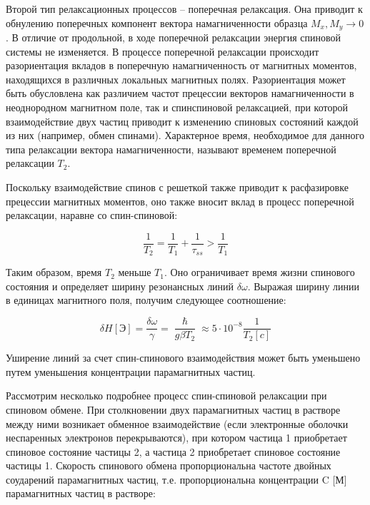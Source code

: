 \documentclass{article}
\begin{document}
Второй тип релаксационных процессов – поперечная релаксация. Она приводит к обнулению поперечных компонент вектора намагниченности образца $ M_x, M_y \rightarrow 0$. В отличие от продольной, в ходе поперечной релаксации энергия спиновой системы не изменяется. В процессе поперечной релаксации происходит разориентация вкладов в поперечную намагниченность от магнитных моментов, находящихся в различных локальных магнитных полях. Разориентация может быть обусловлена как различием частот прецессии векторов намагниченности в неоднородном магнитном поле, так и спинспиновой релаксацией, при которой взаимодействие двух частиц приводит к изменению спиновых состояний каждой из них (например, обмен спинами). Характерное время, необходимое для данного типа релаксации вектора намагниченности, называют временем поперечной релаксации $T_2$.

Поскольку взаимодействие спинов с решеткой также приводит к расфазировке прецессии магнитных моментов, оно также вносит вклад в процесс поперечной релаксации, наравне со спин-спиновой:

\begin{equation}
\frac{1}{T_{2}}=\frac{1}{T_{1}}+\frac{1}{ \tau_{ss}}>\frac{1}{T_{1}}
\end{equation}

Таким образом, время $T_2$ меньше $T_1$. Оно ограничивает время жизни спинового состояния и определяет ширину резонансных линий $\delta  \omega$. Выражая ширину линии в единицах магнитного поля, получим следующее соотношение:

\begin{equation}
\delta H \left[ \text{Э} \right] =\frac{ \delta  \omega }{ \gamma }=\frac{\hslash}{g \beta T_{2}} \approx 5\cdot10^{-8}\frac{1}{T_{2} \left[ c \right] }
\end{equation}

Уширение линий за счет спин-спинового взаимодействия может быть уменьшено путем уменьшения концентрации парамагнитных частиц.

Рассмотрим несколько подробнее процесс спин-спиновой релаксации при спиновом обмене. При столкновении двух парамагнитных частиц в растворе между ними возникает обменное взаимодействие (если электронные оболочки неспаренных электронов перекрываются), при котором частица 1 приобретает спиновое состояние частицы 2, а частица 2 приобретает спиновое состояние частицы 1. Скорость спинового обмена пропорциональна частоте двойных соударений парамагнитных частиц, т.е. пропорциональна концентрации C [М] парамагнитных частиц в растворе:
\end{document}
